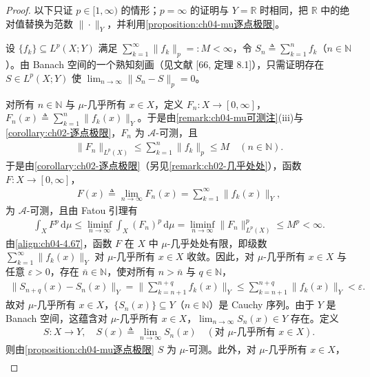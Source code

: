 \documentclass[../../main.tex]{subfiles}%
\begin{document}
\begin{proof}
以下只证 $p\in[1,\infty)$ 的情形；$p=\infty$ 的证明与 $Y=\mathbb{R}$ 时相同，把 $\mathbb{R}$ 中的绝对值替换为范数 $\|\cdot\|_Y$，并利用\cref{proposition:ch04-mu逐点极限}。

设 $\{f_k\}\subseteq L^p(X;Y)$ 满足 $\sum_{k=1}^\infty\|f_k\|_p=:M<\infty$，令 $S_n\triangleq \sum_{k=1}^n f_k$（$n\in\mathbb{N}$）。由 Banach 空间的一个熟知刻画（见文献 [66, 定理 8.1]），只需证明存在 $S\in L^p(X;Y)$ 使 $\lim_{n\to\infty}\|S_n-S\|_p=0$。

对所有 $n\in\mathbb{N}$ 与 $\mu$-几乎所有 $x\in X$，定义 $F_n:X\to[0,\infty]$，$F_n(x)\triangleq \sum_{k=1}^n\|f_k(x)\|_Y$。于是由\cref{remark:ch04-mu可测注}(iii)与\cref{corollary:ch02-逐点极限}，$F_n$ 为 $\mathcal{A}$-可测，且
\begin{align*}
\|F_n\|_{L^p(X)}\leqslant\sum_{k=1}^n\|f_k\|_p\leqslant M\quad(n\in\mathbb{N}).
\end{align*}
于是由\cref{corollary:ch02-逐点极限}（另见\cref{remark:ch02-几乎处处}），函数 $F:X\to[0,\infty]$，
\begin{align*}
F(x)\triangleq \lim_{n\to\infty}F_n(x)=\sum_{k=1}^\infty\|f_k(x)\|_Y,
\end{align*}
为 $\mathcal{A}$-可测，且由 Fatou 引理有
\begin{align}
\int_X F^p\,\mathrm{d}\mu\leqslant\liminf_{n\to\infty}\int_X(F_n)^p\,\mathrm{d}\mu=\liminf_{n\to\infty}\|F_n\|_{L^p(X)}^p\leqslant M^p<\infty. \label{align:ch04-4.67}
\end{align}
由\eqref{align:ch04-4.67}，函数 $F$ 在 $X$ 中 $\mu$-几乎处处有限，即级数 $\sum_{k=1}^\infty\|f_k(x)\|_Y$ 对 $\mu$-几乎所有 $x\in X$ 收敛。因此，对 $\mu$-几乎所有 $x\in X$ 与任意 $\varepsilon>0$，存在 $\bar n\in\mathbb{N}$，使对所有 $n>\bar n$ 与 $q\in\mathbb{N}$，
\begin{align*}
\|S_{n+q}(x)-S_n(x)\|_Y=\Big\|\sum_{k=n+1}^{n+q}f_k(x)\Big\|_Y\leqslant\sum_{k=n+1}^{n+q}\|f_k(x)\|_Y<\varepsilon.
\end{align*}
故对 $\mu$-几乎所有 $x\in X$，$\{S_n(x)\}\subseteq Y$（$n\in\mathbb{N}$）是 Cauchy 序列。由于 $Y$ 是 Banach 空间，这蕴含对 $\mu$-几乎所有 $x\in X$，$\lim_{n\to\infty}S_n(x)\in Y$ 存在。定义
\begin{align}
S:X\to Y,\quad S(x)\triangleq \lim_{n\to\infty}S_n(x)\quad(\text{对 }\mu\text{-几乎所有 }x\in X). \label{align:ch04-4.68}
\end{align}
则由\cref{proposition:ch04-mu逐点极限} $S$ 为 $\mu$-可测。此外，对 $\mu$-几乎所有 $x\in X$，
\begin{align}

\end{align}
\end{proof}
\end{document}
